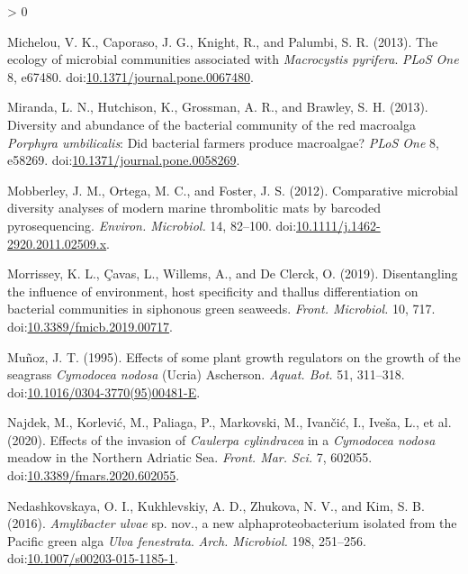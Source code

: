 \documentclass[
  12pt,
]{article}
\newlength{\cslhangindent}
\newenvironment{CSLReferences}[2] %
 {%
  \setlength{\parindent}{0pt}
  \ifodd #1 \everypar{\setlength{\hangindent}{\cslhangindent}}\ignorespaces\fi
  \ifnum #2 > 0
  \setlength{\parskip}{#2\baselineskip}
  \fi
 }%
 {}
\begin{document}
\begin{CSLReferences}{1}{0}
\leavevmode\hypertarget{ref-Michelou2013}{}%
Michelou, V. K., Caporaso, J. G., Knight, R., and Palumbi, S. R. (2013).
The ecology of microbial communities associated with {\emph{Macrocystis
pyrifera}}. \emph{PLoS One} 8, e67480.
doi:\href{https://doi.org/10.1371/journal.pone.0067480}{10.1371/journal.pone.0067480}.

\leavevmode\hypertarget{ref-Miranda2013}{}%
Miranda, L. N., Hutchison, K., Grossman, A. R., and Brawley, S. H.
(2013). Diversity and abundance of the bacterial community of the red
macroalga {\emph{Porphyra umbilicalis}}: Did bacterial farmers produce
macroalgae? \emph{PLoS One} 8, e58269.
doi:\href{https://doi.org/10.1371/journal.pone.0058269}{10.1371/journal.pone.0058269}.

\leavevmode\hypertarget{ref-Mobberley2012}{}%
Mobberley, J. M., Ortega, M. C., and Foster, J. S. (2012). Comparative
microbial diversity analyses of modern marine thrombolitic mats by
barcoded pyrosequencing. \emph{Environ. Microbiol.} 14, 82--100.
doi:\href{https://doi.org/10.1111/j.1462-2920.2011.02509.x}{10.1111/j.1462-2920.2011.02509.x}.

\leavevmode\hypertarget{ref-Morrissey2019}{}%
Morrissey, K. L., Çavas, L., Willems, A., and De Clerck, O. (2019).
Disentangling the influence of environment, host specificity and thallus
differentiation on bacterial communities in siphonous green seaweeds.
\emph{Front. Microbiol.} 10, 717.
doi:\href{https://doi.org/10.3389/fmicb.2019.00717}{10.3389/fmicb.2019.00717}.

\leavevmode\hypertarget{ref-Munoz1995}{}%
Muñoz, J. T. (1995). Effects of some plant growth regulators on the
growth of the seagrass {\emph{Cymodocea nodosa}} ({Ucria}) {Ascherson}.
\emph{Aquat. Bot.} 51, 311--318.
doi:\href{https://doi.org/10.1016/0304-3770(95)00481-E}{10.1016/0304-3770(95)00481-E}.

\leavevmode\hypertarget{ref-Najdek2020a}{}%
Najdek, M., Korlević, M., Paliaga, P., Markovski, M., Ivančić, I.,
Iveša, L., et al. (2020). Effects of the invasion of {\emph{Caulerpa
cylindracea}} in a {\emph{Cymodocea nodosa}} meadow in the {Northern
Adriatic Sea}. \emph{Front. Mar. Sci.} 7, 602055.
doi:\href{https://doi.org/10.3389/fmars.2020.602055}{10.3389/fmars.2020.602055}.

\leavevmode\hypertarget{ref-Nedashkovskaya2016}{}%
Nedashkovskaya, O. I., Kukhlevskiy, A. D., Zhukova, N. V., and Kim, S.
B. (2016). {{\emph{Amylibacter ulvae}} sp. nov., a new
alphaproteobacterium isolated from the Pacific green alga {\emph{Ulva
fenestrata}}}. \emph{Arch. Microbiol.} 198, 251--256.
doi:\href{https://doi.org/10.1007/s00203-015-1185-1}{10.1007/s00203-015-1185-1}.


\end{CSLReferences}
\end{document}
